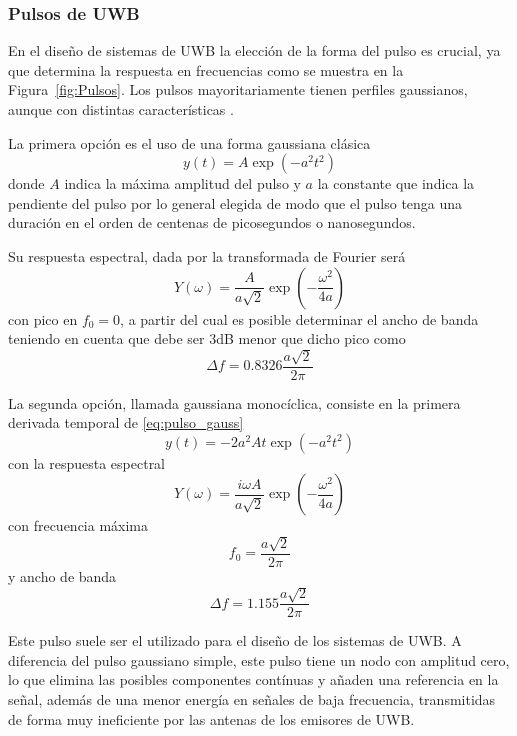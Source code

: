 \subsubsection{Pulsos de UWB}

En el diseño de sistemas de UWB la elección de la forma del pulso es crucial, ya que determina la respuesta en frecuencias como se muestra en la Figura~\ref{fig:Pulsos}.
Los pulsos mayoritariamente tienen perfiles gaussianos, aunque con distintas características \cite{Du}.

La primera opción es el uso de una forma gaussiana clásica
\begin{equation}\label{eq:pulso_gauss}
    y(t) = A\exp(-a^2 t^2)
\end{equation}
donde $A$ indica la máxima amplitud del pulso y $a$ la constante que indica la pendiente del pulso por lo general elegida de modo que el pulso tenga una duración en el orden de centenas de picosegundos o nanosegundos.

Su respuesta espectral, dada por la transformada de Fourier será    
\begin{equation}
    Y(\omega) = \frac{A}{a\sqrt{2}}\exp(-\frac{\omega^2}{4a})
\end{equation}
con pico en $f_0=0$, a partir del cual es posible determinar el ancho de banda teniendo en cuenta que debe ser 3dB menor que dicho pico como
\begin{equation}
    \Delta f = 0.8326\frac{a\sqrt{2}}{2\pi}
\end{equation}

La segunda opción, llamada gaussiana monocíclica, consiste en la primera derivada temporal de \eqref{eq:pulso_gauss}
\begin{equation}
    y(t) = -2 a^2 At\exp(-a^2 t^2)
\end{equation}
con la respuesta espectral
\begin{equation}
    Y(\omega) = \frac{i\omega A}{a\sqrt{2}}\exp(-\frac{\omega^2}{4a})
\end{equation}
con frecuencia máxima
\begin{equation}
    f_0 = \frac{a\sqrt{2}}{2\pi}
\end{equation}
y ancho de banda
\begin{equation}
    \Delta f = 1.155\frac{a\sqrt{2}}{2\pi}
\end{equation}

Este pulso suele ser el utilizado para el diseño de los sistemas de UWB.
A diferencia del pulso gaussiano simple, este pulso tiene un nodo con amplitud cero, lo que elimina las posibles componentes contínuas y añaden una referencia en la señal, además de una menor energía en señales de baja frecuencia, transmitidas de forma muy ineficiente por las antenas de los emisores de UWB.

